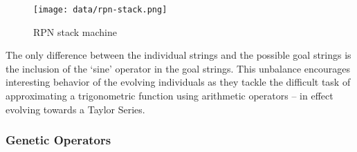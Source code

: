 \documentclass[11pt]{article}
\begin{document}
\begin{figure}[htb]
\centering
\texttt{[image: data/rpn-stack.png]}
\caption{RPN stack machine}
\end{figure}



The only difference between the individual strings and the possible
goal strings is the inclusion of the `sine' operator in the goal
strings.  This unbalance encourages interesting behavior of the
evolving individuals as they tackle the difficult task of
approximating a trigonometric function using arithmetic operators --
in effect evolving towards a Taylor Series.

\subsubsection*{Genetic Operators}
\label{sec-1.3.2}
\end{document}
